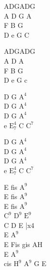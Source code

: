 \begin{chord}
    ADGADG\\
    A D G A\\
    F B G\\
    D e G C

    ADGADG\\
    A D A\\
    F B G\\
    D e G c

    D G $\mathrm{A^4}$\\
    D G $\mathrm{A^4}$\\
    D G $\mathrm{A^4}$\\
    e $\mathrm{E_7^4}$ C $\mathrm{C^7}$

    \hfill\break
    \hfill\break
    \hfill\break
    \hfill\break
    \hfill\break
    \hfill\break
    \hfill\break
    \hfill\break
    \hfill\break
    \hfill\break
    D G $\mathrm{A^4}$\\
    D G $\mathrm{A^4}$\\
    D G $\mathrm{A^4}$\\
    e $\mathrm{E_7^4}$ C $\mathrm{C^7}$

    E fis $\mathrm{A^9}$\\
    E fis $\mathrm{A^9}$\\
    E fis $\mathrm{A^9}$\\
    $\mathrm{C^9}$ $\mathrm{D^9}$ $\mathrm{E^9}$\\
    C D E |x4\\
    E $\mathrm{A^9}$\\
    E Fis gis AH\\
    E $\mathrm{A^9}$\\
    cis $\mathrm{H^9}$ $\mathrm{A^9}$ G E
\end{chord}
